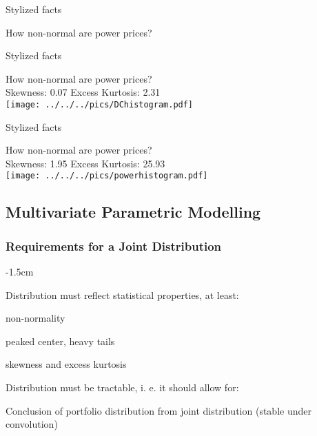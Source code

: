 {Stylized facts}
\begin{center}
How non-normal are power prices?\\
\end{center}

{Stylized facts}
\begin{center}
How non-normal are power prices?\\
Skewness: 0.07 \hspace{2cm} Excess Kurtosis: 2.31\\
\texttt{[image: ../../../pics/DChistogram.pdf]}
\end{center}

{Stylized facts} %
\begin{center}
How non-normal are power prices?\\
Skewness: 1.95 \hspace{2cm} Excess Kurtosis: 25.93\\
\texttt{[image: ../../../pics/powerhistogram.pdf]}
\end{center}

\subsection{Multivariate Parametric Modelling}
\subsubsection{Requirements for a Joint Distribution}

{-1.5cm}






	Distribution must reflect statistical properties, at least:

	non-normality

	peaked center, heavy tails

	skewness and excess kurtosis

	Distribution must be tractable, i. e. it should allow for:

	Conclusion of portfolio distribution from joint distribution (stable under convolution)

